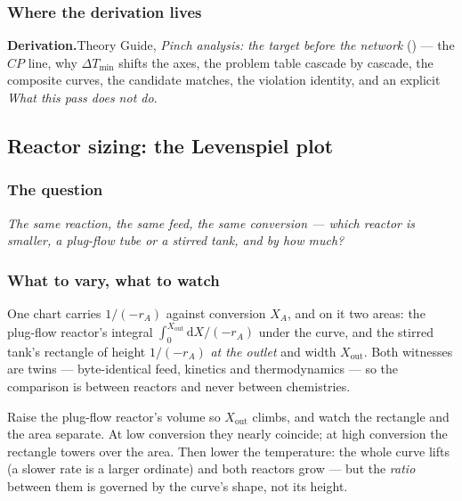 \documentclass[11pt,a4paper]{article}
\newcommand{\derivation}[1]{%
  \smallskip\noindent\textbf{\sffamily\small Derivation.}\quad #1\par\smallskip}
\begin{document}
\subsubsection*{Where the derivation lives}

\derivation{Theory Guide, \emph{Pinch analysis: the target before the
network} (\theorydest{ch:pinch}) --- the $CP$ line, why $\Delta T_{\min}$
shifts the axes, the problem table cascade by cascade, the composite
curves, the candidate matches, the violation identity, and an explicit
\emph{What this pass does not do}.}

\subsection{Reactor sizing: the Levenspiel plot}\label{sec:edu-levenspiel}


\subsubsection*{The question}

\emph{The same reaction, the same feed, the same conversion --- which
reactor is smaller, a plug-flow tube or a stirred tank, and by how much?}

\subsubsection*{What to vary, what to watch}

One chart carries $1/(-r_A)$ against conversion $X_A$, and on it two
areas: the plug-flow reactor's integral $\int_0^{X_{\mathrm{out}}}
\mathrm{d}X/(-r_A)$ under the curve, and the stirred tank's rectangle of
height $1/(-r_A)$ \emph{at the outlet} and width $X_{\mathrm{out}}$.  Both
witnesses are twins --- byte-identical feed, kinetics and thermodynamics
--- so the comparison is between reactors and never between chemistries.

\begin{tryit}
Raise the plug-flow reactor's volume so $X_{\mathrm{out}}$ climbs, and
watch the rectangle and the area separate.  At low conversion they nearly
coincide; at high conversion the rectangle towers over the area.  Then
lower the temperature: the whole curve lifts (a slower rate is a larger
ordinate) and both reactors grow --- but the \emph{ratio} between them is
governed by the curve's shape, not its height.
\end{tryit}
\end{document}
